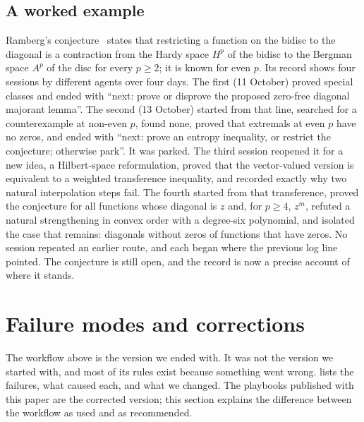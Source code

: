 \documentclass[11pt]{amsart}
\newcommand*{\sectionbreak}{\clearpage} %
\begin{document}
\subsection*{A worked example}
Ramberg's conjecture~\cites{ramberg,bbhop} states that restricting a function
on the bidisc to the diagonal is a contraction from the Hardy space $H^p$ of
the bidisc to the Bergman space $A^p$ of the disc for every $p\ge2$; it is
known for even $p$. Its record shows four sessions by different agents over
four days. The first (11 October) proved special classes and ended with ``next:
prove or disprove the proposed zero-free diagonal majorant lemma''. The second
(13 October) started from that line, searched for a counterexample at non-even
$p$, found none, proved that extremals at even $p$ have no zeros, and ended
with ``next: prove an entropy inequality, or restrict the conjecture; otherwise
park''. It was parked. The third session reopened it for a new idea, a
Hilbert-space reformulation, proved that the vector-valued version is
equivalent to a weighted transference inequality, and recorded exactly why two
natural interpolation steps fail. The fourth started from that transference,
proved the conjecture for all functions whose diagonal is $z$ and, for $p\ge4$,
$z^m$, refuted a natural strengthening in convex order with a degree-six
polynomial, and isolated the case that remains: diagonals without zeros of
functions that have zeros. No session repeated an earlier route, and each began
where the previous log line pointed. The conjecture is still open, and the
record is now a precise account of where it stands.

\sectionbreak
\section{Failure modes and corrections}\label{sec:failures}

The workflow above is the version we ended with. It was not the version we
started with, and most of its rules exist because something went wrong.
 lists the failures, what caused each, and what we changed.
The playbooks published with this paper are the corrected version; this section
explains the difference between the workflow as used and as recommended.
\end{document}
